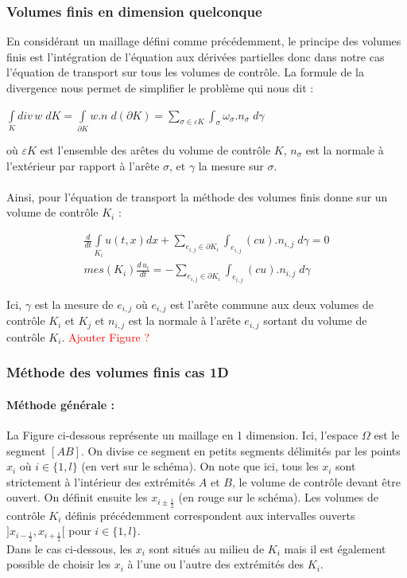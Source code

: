 \documentclass[12pt]{article}
\begin{document}
\subsubsection{Volumes finis en dimension quelconque}
\noindent En considérant un maillage défini comme précédemment, le principe des volumes finis \cite{ref7} est l'intégration de l'équation aux dérivées partielles donc dans notre cas l'équation de transport sur tous les volumes de contrôle. 
La formule de la divergence nous permet de simplifier le problème qui nous dit :
\\
\begin{center}
    $\displaystyle\int\limits_{K} div\, w \; dK=\int\limits_{\partial{K}} w.n \; d(\partial{K}) = \displaystyle\sum_{\sigma \in \varepsilon{K}} \int_{\sigma} \omega_{\sigma}.n_{\sigma} \; d\gamma$
\end{center}
où $\varepsilon K$ est l'ensemble des arêtes du volume de contrôle $K$, $n_{\sigma}$ est la normale à l'extérieur par rapport à l'arête $\sigma$, et $\gamma$ la mesure sur $\sigma$.
\\
\\Ainsi, pour l'équation de transport la méthode des volumes finis donne sur un volume de contrôle $K_i$ :

\begin{eqnarray}
       \frac{d}{dt} \int\limits_{K_i} u(t,x)dx + \displaystyle \sum_{e_{i,j}\in \partial K_i} \int_{e_{i,j}} (cu).{n_{i,j}} \; d\gamma=0
       \\mes(K_i)\frac{d\,u_i}{dt}=-\displaystyle\sum_{e_{i,j}\in \partial K_i} \int_{e_{i,j}} (cu).{n_{i,j}} \; d\gamma
\end{eqnarray}

\noindent Ici, $\gamma$ est la mesure de $e_{i,j}$ où $e_{i,j}$ est l'arête commune aux deux volumes de contrôle $K_i$ et $K_j$ et $n_{i,j}$ est la normale à l'arête $e_{i,j}$ sortant du volume de contrôle $K_i$. 
\textcolor{red}{Ajouter Figure ?}

\subsubsection{Méthode des volumes finis cas 1D }
\paragraph{Méthode générale :}
La Figure ci-dessous représente un maillage en 1 dimension. Ici, l'espace $\Omega$ est le segment $[AB]$. On divise ce segment en petits segments délimités par les points $x_i$ où $i\in \{1,l\}$ (en vert sur le schéma). On note que ici, tous les $x_i$ sont strictement à l'intérieur des extrémités $A$ et $B$, le volume de contrôle devant être ouvert. On définit ensuite les $x_{i\pm\frac{1}{2}}$ (en rouge sur le schéma). Les volumes de contrôle $K_i$ définis précédemment correspondent aux intervalles ouverts $]x_{i-\frac{1}{2}},x_{i+\frac{1}{2}}[$ pour $i\in \{1,l\}$.
\\Dans le cas ci-dessous, les $x_i$ sont situés au milieu de $K_i$ mais il est également possible de choisir les $x_i$ à l'une ou l'autre des extrémités des $K_i$. 
\end{document}
